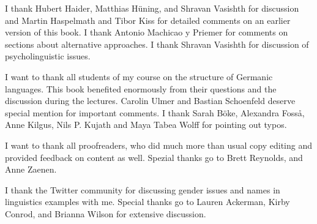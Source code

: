 \addchap{\lsAcknowledgementTitle} 

I thank Hubert Haider, Matthias Hüning, and Shravan Vasishth for discussion and Martin Haspelmath and Tibor Kiss for detailed comments
on an earlier version of this book. I thank Antonio Machicao y Priemer for comments on sections
about alternative approaches. I thank Shravan Vasishth for discussion of psycholinguistic issues.

I want to thank all students of my course on the structure of Germanic languages. This book
benefited enormously from their questions and the discussion during the lectures. 
Carolin Ulmer %
and
Bastian Schoenfeld %
deserve special mention for important comments. I thank 
Sarah Böke,
Alexandra Fosså,
Anne Kilgus,
Nils P. Kujath
and 
Maya Tabea Wolff  
for pointing out typos.

I want to thank all proofreaders, who did much more than usual copy editing and provided feedback on
content as well.  Spezial thanks go to Brett Reynolds, and Anne Zaenen.


I thank the Twitter community for discussing gender issues and names in linguistics examples with
me. Special thanks go to Lauren Ackerman, Kirby Conrod, and Brianna Wilson for extensive discussion.





